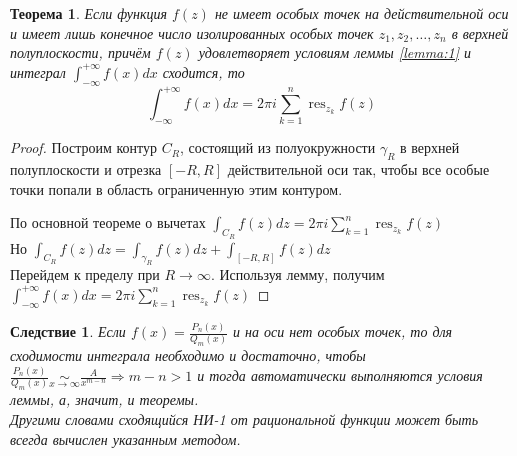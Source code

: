 \documentclass[a4paper, 12pt]{article}
\DeclareMathOperator*{\res}{res}
\theoremstyle{definition}
\theoremstyle{definition}
\theoremstyle{plain}
\theoremstyle{plain}
\newtheorem*{theorem}{Теорема}
\theoremstyle{plain}
\newtheorem*{corollary}{Следствие}
\begin{document}
\begin{theorem}
    Если функция $f(z)$ не имеет особых точек на действительной оси и имеет лишь конечное число изолированных особых точек
    $z_1, z_2, \dotsc, z_n$ в верхней полуплоскости, причём $f(z)$ удовлетворяет условиям леммы \eqref{lemma:1} и интеграл
    $\displaystyle \int_{-\infty}^{+\infty}f(x)dx$ сходится, то
    \begin{equation}
        \int_{-\infty}^{+\infty}f(x)dx = 2\pi i \sum_{k=1}^n \res_{z_k} f(z)
    \end{equation}
\end{theorem}
\pagebreak
\begin{proof}
    Построим контур $C_R$, состоящий из полуокружности $\gamma_R$ в верхней полуплоскости и отрезка $[-R, R]$ действительной оси
    так, чтобы все особые точки попали в область ограниченную этим контуром. \\
    \begin{center}
    \end{center}
    По основной теореме о вычетах
    $\displaystyle \int_{C_R} f(z)dz = 2\pi i \sum_{k=1}^n \res_{z_k} f(z)$ \\
    Но $\displaystyle \int_{C_R} f(z)dz = \int_{\gamma_R} f(z)dz + \int_{[-R, R]} f(z)dz$ \\
    Перейдем к пределу при $R \to \infty$. Используя лемму, получим \\
    $\displaystyle \int_{-\infty}^{+\infty}f(x)dx = 2\pi i \sum_{k=1}^n \res_{z_k} f(z)$
\end{proof}
\begin{corollary}
    Если $\displaystyle f(x)=\frac{P_n(x)}{Q_m(x)}$ и на оси нет особых точек, то для сходимости интеграла необходимо и достаточно, чтобы
    $\displaystyle \frac{P_n(x)}{Q_m(x)} \underset{x \to \infty}{\sim} \frac{A}{x^{m-n}} \Rightarrow m-n>1$ и тогда автоматически выполняются условия леммы, а, значит, и теоремы. \\
    Другими словами сходящийся НИ-1 от рациональной функции может быть всегда вычислен указанным методом.
\end{corollary}
\end{document}
